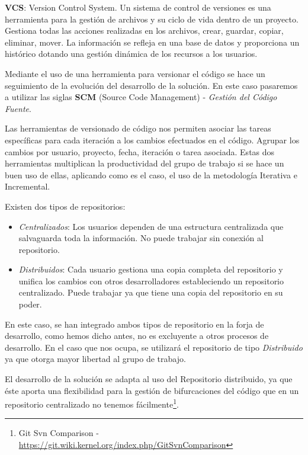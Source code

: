 \par \textbf{VCS}: Version Control System. Un sistema de control de versiones es una herramienta para la gestión de archivos y su ciclo de vida dentro de un proyecto. Gestiona todas las acciones realizadas en los archivos, crear, guardar, copiar, eliminar, mover. La información se refleja en una base de datos y proporciona un histórico dotando una gestión dinámica de los recursos a los usuarios.

\par Mediante el uso de una herramienta para versionar el código se hace un seguimiento de la evolución del desarrollo de la solución. En este caso pasaremos a utilizar las siglas \textbf{SCM} (Source Code Management) - \emph{Gestión del Código Fuente}.

\par Las herramientas de versionado de código nos permiten asociar las tareas específicas para cada iteración a los cambios efectuados en el código. Agrupar los cambios por usuario, proyecto, fecha, iteración o tarea asociada. Estas dos herramientas multiplican la productividad del grupo de trabajo si se hace un buen uso de ellas, aplicando como es el caso, el uso de la metodología Iterativa e Incremental.

\par Existen dos tipos de repositorios:

\begin{itemize}
	\item \emph{Centralizados}: Los usuarios dependen de una estructura centralizada que salvaguarda toda la información. No puede trabajar sin conexión al repositorio.
	\item \emph{Distribuidos}: Cada usuario gestiona una copia completa del repositorio y unifica los cambios con otros desarrolladores estableciendo un repositorio centralizado. Puede trabajar ya que tiene una copia del repositorio en su poder.
\end{itemize}

\par En este caso, se han integrado ambos tipos de repositorio en la forja de desarrollo, como hemos dicho antes, no es excluyente a otros procesos de desarrollo. En el caso que nos ocupa, se utilizará el repositorio de tipo \emph{Distribuido} ya que otorga mayor libertad al grupo de trabajo.

\par El desarrollo de la solución se adapta al uso del Repositorio distribuido, ya que éste aporta una flexibilidad para la gestión de bifurcaciones del código que en un repositorio centralizado no tenemos fácilmente\footnote{Git Svn Comparison - \url{https://git.wiki.kernel.org/index.php/GitSvnComparison}}. 

